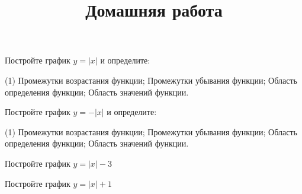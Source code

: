 \begin{consultation}
	\begin{listofex}
		\item Постройте график \( y=|x| \) и определите: 
		\begin{tasks}(1)
			\task Промежутки возрастания функции;
			\task Промежутки убывания функции;
			\task Область определения функции;
			\task Область значений функции.
		\end{tasks}
		\item Постройте график \( y=-|x| \) и определите: 
		\begin{tasks}(1)
			\task Промежутки возрастания функции;
			\task Промежутки убывания функции;
			\task Область определения функции;
			\task Область значений функции.
		\end{tasks}
		\item Постройте график \( y=|x|-3 \)
	\end{listofex}
	\newpage
	\title{Домашняя работа}
	\begin{listofex}
		\item Постройте график \( y=|x|+1 \)
	\end{listofex}
\end{consultation}
